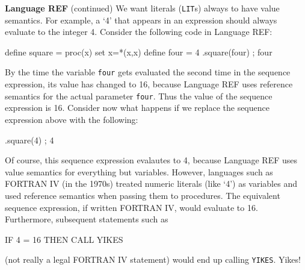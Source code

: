 \begin{minipage}[t]{\sw}
\slidenumber
\LARGE
{\bf Language REF} (continued)\exx
We want literals (\verb'LIT's) always to have value semantics.
For example, a `4' that appears in an expression should always evaluate
to the integer 4. Consider the following code in Language REF:
{\Large
\begin{qv}
define square = proc(x) set x=*(x,x)
define four = 4
{ .square(four) ; four }
\end{qv}
}
By the time the variable \verb'four' gets evaluated the second time
in the sequence expression, its value has changed to 16,
because Language REF uses reference semantics
for the actual parameter \verb'four'.
Thus the value of the sequence expression is 16.
Consider now what happens if we replace the sequence expression above
with the following:
{\Large
\begin{qv}
{ .square(4) ; 4 }
\end{qv}
}
Of course, this sequence expression evalautes to 4,
because Language REF uses value semantics for everything but variables.
However, languages such as FORTRAN IV (in the 1970s)
treated numeric literals (like `4')
as variables and used reference semantics
when passing them to procedures.
The equivalent sequence expression, if written FORTRAN IV,
would evaluate to 16.
Furthermore, subsequent statements such as
{\Large
\begin{qv}
IF 4 = 16 THEN CALL YIKES 
\end{qv}
}
(not really a legal FORTRAN IV statement)
would end up calling \verb'YIKES'. 
Yikes!
\end{minipage}
\clearpage
